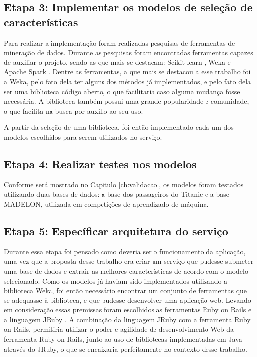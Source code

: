 \subsection{Etapa 3: Implementar os modelos de seleção de características}

Para realizar a implementação foram realizadas pesquisas de ferramentas de mineração de dados. Durante as pesquisas foram encontradas ferramentas capazes de auxiliar o projeto, sendo as que mais se destacam: Scikit-learn \cite{scikit}, Weka \cite{weka_2005} e Apache Spark \cite{spark}. Dentre as ferramentas, a que mais se destacou a esse trabalho foi a Weka, pelo fato dela ter alguns dos métodos já implementados, e pelo fato dela ser uma biblioteca código aberto, o que facilitaria caso alguma mudança fosse necessária. A biblioteca também possui uma grande popularidade e comunidade, o que facilita na busca por auxilio ao seu uso.

A partir da seleção de uma biblioteca, foi então implementado cada um dos modelos escolhidos para serem utilizados no serviço.

\subsection{Etapa 4: Realizar testes nos modelos}

Conforme será mostrado no Capitulo \ref{ch:validacao}, os modelos foram testados utilizando duas bases de dados: a base dos passageiros do Titanic e a base MADELON, utilizada em competições de aprendizado de máquina. 

\subsection{Etapa 5: Específicar arquitetura do serviço}

Durante essa etapa foi pensado como deveria ser o funcionamento da aplicação, uma vez que a proposta desse trabalho era criar um serviço que pudesse submeter uma base de dados e extrair as melhores características de acordo com o modelo selecionado. Como os modelos já haviam sido implementados utilizando a biblioteca Weka, foi então necessário encontrar um conjunto de ferramentas que se adequasse à biblioteca, e que pudesse desenvolver uma aplicação web. Levando em consideração essas premissas foram escolhidos as ferramentas Ruby on Rails \cite{ror} e a linguagem JRuby \cite{jruby}. A combinação da linguagem JRuby com a ferramenta Ruby on Rails, permitiria utilizar o poder e agilidade de desenvolvimento Web da ferramenta Ruby on Rails, junto ao uso de bibliotecas implementadas em Java através do JRuby, o que se encaixaria perfeitamente no contexto desse trabalho.

